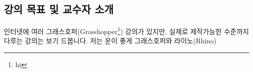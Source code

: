 % 
%
%

\begin{partbacktext}
\part{강의 목표 및 교수자 소개}
\noindent 인터넷에 여러 그래스호퍼(Grasshopper\footnote{hi}) 강의가 있지만, 실제로 제작가능한 수준까지 다루는 강의는 보기 드뭅니다. 저는 운이 좋게 그래스호퍼와 라이노(Rhino)

\end{partbacktext}